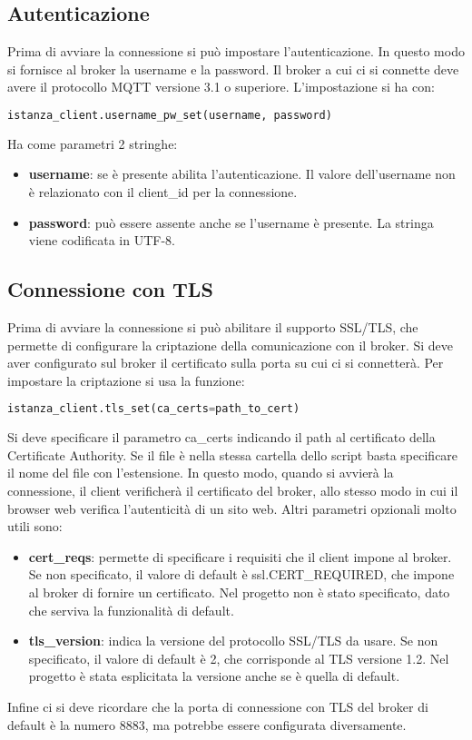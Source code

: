 \subsection{Autenticazione}
\label{subsec:client-creazione-auth}
Prima di avviare la connessione si può impostare l'autenticazione.
In questo modo si fornisce al broker la username e la password.
Il broker a cui ci si connette deve avere il protocollo MQTT versione 3.1 o superiore.
L'impostazione si ha con:
\begin{lstlisting}[language=python]
	istanza_client.username_pw_set(username, password)
\end{lstlisting}
Ha come parametri 2 stringhe:
\begin{itemize}
	\item \textbf{username}: se è presente abilita l'autenticazione.
	Il valore dell'username non è relazionato con il client\_id per la connessione.
	\item \textbf{password}: può essere assente anche se l'username è presente.
	La stringa viene codificata in UTF-8.
\end{itemize}

\subsection{Connessione con TLS}
\label{subsec:client-creazione-tls}
Prima di avviare la connessione si può abilitare il supporto SSL/TLS, 
che permette di configurare la criptazione della comunicazione con il broker.
Si deve aver configurato sul broker il certificato sulla porta su cui ci si connetterà.
Per impostare la criptazione si usa la funzione:
\begin{lstlisting}[language=python]
	istanza_client.tls_set(ca_certs=path_to_cert)
\end{lstlisting}
Si deve specificare il parametro ca\_certs indicando il path al certificato della Certificate Authority.
Se il file è nella stessa cartella dello script basta specificare il nome del file con l'estensione.
In questo modo, quando si avvierà la connessione, il client verificherà il certificato del broker,
allo stesso modo in cui il browser web verifica l'autenticità di un sito web.
Altri parametri opzionali molto utili sono:
\begin{itemize}
	\item \textbf{cert\_reqs}: permette di specificare i requisiti che il client impone al broker.
	Se non specificato, il valore di default è ssl.CERT\_REQUIRED, che impone al broker di fornire un certificato.
	Nel progetto non è stato specificato, dato che serviva la funzionalità di default.
	\item \textbf{tls\_version}: indica la versione del protocollo SSL/TLS da usare.
	Se non specificato, il valore di default è 2, che corrisponde al TLS versione 1.2.
	Nel progetto è stata esplicitata la versione anche se è quella di default.
\end{itemize}
Infine ci si deve ricordare che la porta di connessione con TLS del broker di default è la numero 8883, 
ma potrebbe essere configurata diversamente.


